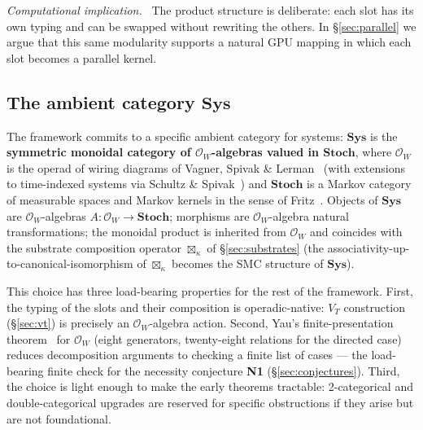 \documentclass[journal]{IEEEtran}
\theoremstyle{plain}
\theoremstyle{definition}
\theoremstyle{plain}
\newenvironment{implnote}[1][Computational implication]{%
  \par\smallskip\noindent\emph{#1.}\ }{\par\smallskip}
\begin{document}
\begin{implnote}[Computational implication]
The product structure is deliberate: each slot has its own typing and can be
swapped without rewriting the others. In \S\ref{sec:parallel} we argue that
this same modularity supports a natural GPU mapping in which each slot
becomes a parallel kernel.
\end{implnote}

\subsection{The ambient category $\mathbf{Sys}$}\label{sec:ambient}

The framework commits to a specific ambient category for systems:
$\mathbf{Sys}$ is the \textbf{symmetric monoidal category of
$\mathcal{O}_W$-algebras valued in $\mathbf{Stoch}$}, where $\mathcal{O}_W$
is the operad of wiring diagrams of Vagner, Spivak \&
Lerman~\cite{vagner2015algebras} (with extensions to time-indexed systems
via Schultz \& Spivak~\cite{schultz2020sheaves}) and $\mathbf{Stoch}$ is a
Markov category of measurable spaces and Markov kernels in the sense of
Fritz~\cite{fritz2020synthetic}. Objects of $\mathbf{Sys}$ are
$\mathcal{O}_W$-algebras $A : \mathcal{O}_W \to \mathbf{Stoch}$; morphisms
are $\mathcal{O}_W$-algebra natural transformations; the monoidal product
is inherited from $\mathcal{O}_W$ and coincides with the substrate
composition operator $\boxtimes_\kappa$ of \S\ref{sec:substrates} (the
associativity-up-to-canonical-isomorphism of $\boxtimes_\kappa$ becomes
the SMC structure of $\mathbf{Sys}$).

This choice has three load-bearing properties for the rest of the
framework. First, the typing of the slots and their composition is
operadic-native: $V_T$ construction (\S\ref{sec:vt}) is precisely an
$\mathcal{O}_W$-algebra action. Second, Yau's finite-presentation
theorem~\cite{yau2018operads} for $\mathcal{O}_W$ (eight generators,
twenty-eight relations for the directed case) reduces decomposition
arguments to checking a finite list of cases --- the load-bearing finite
check for the necessity conjecture \textbf{N1}
(\S\ref{sec:conjectures}). Third, the choice is light enough to make the
early theorems tractable: 2-categorical and double-categorical upgrades
are reserved for specific obstructions if they arise but are not
foundational.
\end{document}
